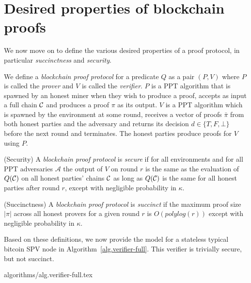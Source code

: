 \section{Desired properties of blockchain proofs}

We now move on to define the various desired properties of a proof protocol, in
particular \textit{succinctness} and \textit{security}.

We define a \textit{blockchain proof protocol} for a predicate $Q$ as a pair
$(P, V)$ where $P$ is called the \textit{prover} and $V$ is called the
\textit{verifier}. $P$ is a PPT algorithm that is spawned by an honest miner
when they wish to produce a proof, accepts as input a full chain $\mathcal{C}$ and
produces a proof $\pi$ as its output. $V$ is a PPT algorithm which is spawned
by the environment at some round, receives a vector of proofs $\bar{\pi}$ from
both honest parties and the adversary and returns its decision $d \in \{T, F,
\bot\}$ before the next round and terminates. The honest parties produce proofs
for $V$ using $P$.

\begin{definition}{(Security)}
A \textit{blockchain proof protocol} is \textit{secure} if for all environments
and for all PPT adversaries $\mathcal{A}$ the output of $V$ on round $r$ is the
same as the evaluation of $Q(\mathcal{C})$ on all honest parties' chains $\mathcal{C}$ as
long as $Q(\mathcal{C})$ is the same for all honest parties after round $r$, except
with negligible probability in $\kappa$.
\end{definition}

\begin{definition}{(Succinctness)}
A \textit{blockchain proof protocol} is \textit{succinct} if the maximum proof
size $|\pi|$ across all honest provers for a given round $r$ is $O(polylog(r))$
except with negligible probability in $\kappa$.
\end{definition}

Based on these definitions, we now provide the model for a stateless typical
bitcoin SPV node in Algorithm~\ref{alg.verifier-full}. This verifier is
trivially secure, but not succinct.

{algorithms/alg.verifier-full.tex}
